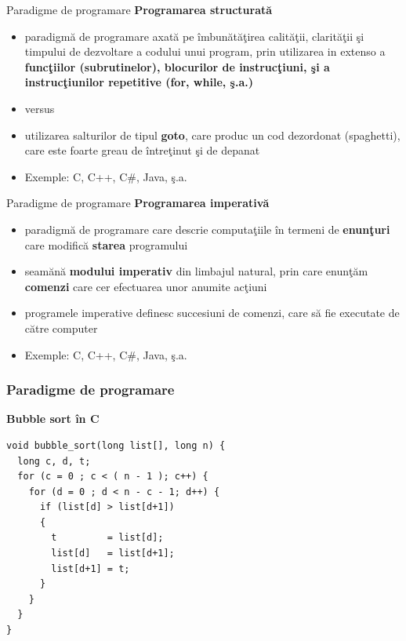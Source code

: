 \documentclass[pdf]{beamer}
\begin{document}
\begin{frame}{Paradigme de programare}
\textbf{Programarea structurată}
\begin{itemize}
\item
paradigmă de programare axată pe îmbunătăţirea calităţii, clarităţii şi timpului de dezvoltare a codului unui program, prin utilizarea in extenso a \textbf{funcţiilor (subrutinelor), blocurilor de instrucţiuni, şi a instrucţiunilor repetitive (for, while, ş.a.)}
\item
versus
\item
utilizarea salturilor de tipul \textbf{goto}, care produc un cod dezordonat (spaghetti), care este foarte greau de întreţinut şi de depanat
\item
Exemple: C, C++, C\#, Java, ş.a.
\end{itemize}
\end{frame}



\begin{frame}{Paradigme de programare}
\textbf{Programarea imperativă}
\begin{itemize}
\item
paradigmă de programare care descrie computaţiile în termeni de \textbf{enunţuri} care modifică \textbf{starea} programului
\item
seamănă \textbf{modului imperativ} din limbajul natural, prin care enunţăm \textbf{comenzi} care cer efectuarea unor anumite acţiuni
\item
programele imperative definesc succesiuni de comenzi, care să fie executate de către computer
\item
Exemple: C, C++, C\#, Java, ş.a.
\end{itemize}
\end{frame}



\begin{frame}[fragile]
\frametitle{Paradigme de programare}
\textbf{Bubble sort în C}
\begin{verbatim}
void bubble_sort(long list[], long n) {
  long c, d, t;
  for (c = 0 ; c < ( n - 1 ); c++) {
    for (d = 0 ; d < n - c - 1; d++) {
      if (list[d] > list[d+1])
      {
        t         = list[d];
        list[d]   = list[d+1];
        list[d+1] = t;
      }
    }
  }
}
\end{verbatim}
\end{frame}
\end{document}
